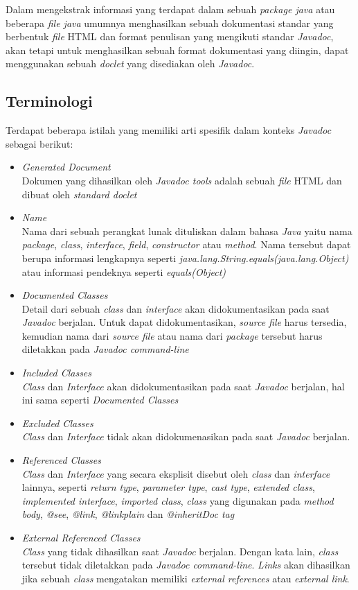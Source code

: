 Dalam mengekstrak informasi yang terdapat dalam sebuah {\it package java} atau beberapa {\it file java} umumnya menghasilkan sebuah dokumentasi standar yang berbentuk {\it file} HTML dan format penulisan yang mengikuti standar {\it Javadoc}, akan tetapi untuk menghasilkan sebuah format dokumentasi yang diingin, dapat menggunakan sebuah {\it doclet} yang disediakan oleh {\it Javadoc}.

\subsection{Terminologi}
\label{sec:terminologi}
Terdapat beberapa istilah yang memiliki arti spesifik dalam konteks {\it Javadoc} sebagai berikut:
\begin{itemize}
	\item {\it Generated Document}\\
	Dokumen yang dihasilkan oleh {\it Javadoc tools} adalah sebuah {\it file} HTML dan dibuat oleh {\it standard doclet}
	\item {\it Name}\\
	Nama dari sebuah perangkat lunak dituliskan dalam bahasa {\it Java} yaitu nama {\it package}, {\it class}, {\it interface}, {\it field}, {\it constructor} atau {\it method}. Nama tersebut dapat berupa informasi lengkapnya seperti {\it java.lang.String.equals(java.lang.Object)} atau informasi pendeknya seperti {\it equals(Object)}
	\item {\it Documented Classes}\\
	Detail dari sebuah {\it class} dan {\it interface} akan didokumentasikan pada saat {\it Javadoc} berjalan. Untuk dapat didokumentasikan, {\it source file} harus tersedia, kemudian nama dari {\it source file} atau nama dari {\it package} tersebut harus diletakkan pada {\it Javadoc command-line}
	\item {\it Included Classes}\\
	{\it Class} dan {\it Interface} akan didokumentasikan pada saat {\it Javadoc} berjalan, hal ini sama seperti {\it Documented Classes}
	\item {\it Excluded Classes}\\
	{\it Class} dan {\it Interface} tidak akan didokumenasikan pada saat {\it Javadoc} berjalan.
	\item {\it Referenced Classes}\\
	{\it Class} dan {\it Interface} yang secara eksplisit disebut oleh {\it class} dan {\it interface} lainnya, seperti {\it return type}, {\it parameter type}, {\it cast type}, {\it extended class}, {\it implemented interface}, {\it imported class}, {\it class} yang digunakan pada {\it method body}, {\it @see}, {\it {@link}}, {\it {@linkplain}} dan {\it {@inheritDoc} tag} 
	\item {\it External Referenced Classes}\\
	{\it Class} yang tidak dihasilkan saat {\it Javadoc} berjalan. Dengan kata lain, {\it class} tersebut tidak diletakkan pada {\it Javadoc command-line}. {\it Links} akan dihasilkan jika sebuah {\it class} mengatakan memiliki {\it external references} atau {\it external link}.
\end{itemize}

